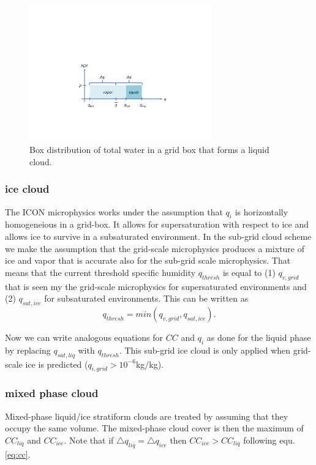 \documentclass[a4paper,11pt]{article}
\begin{document}
\begin{figure}[t]
\centering
\includegraphics*[width=0.7\textwidth,bb=190 130 545 308] {liquidPDF.pdf}
\caption{Box distribution of total water in a grid box that forms a liquid cloud.}
\label{fg:liquidPDF}
\end{figure}

\subsubsection{ice cloud}

The ICON microphysics works under the assumption that $q_i$ is horizontally homogeneious in a grid-box.
It allows for supersaturation with respect to ice and allows ice to survive in a subsaturated environment.
In the sub-grid cloud scheme we make the assumption that the grid-scale microphysics produces a mixture of
ice and vapor that is accurate also for the sub-grid scale microphysics.  That means that the current threshold
specific humidity $q_{thresh}$ is equal to (1) $q_{v,grid}$ that is seen my the grid-scale microphysics for supersaturated
environments and (2) $q_{sat,ice}$ for subsaturated environments.  This can be written as
\begin{equation}
q_{thresh} =  min(q_{v,grid}, q_{sat,ice}).
\end{equation}

Now we can write analogous equations for $CC$ and $q_i$ as done for the liquid phase by replacing $q_{sat,liq}$
with $q_{thresh}$.  This sub-grid ice cloud is only applied when grid-scale ice is predicted 
($q_{i,grid} > 10^{-6}$kg/kg).


\subsubsection{mixed phase cloud}

Mixed-phase liquid/ice stratiform clouds are treated by assuming that they occupy the same volume.  
The mixed-phase cloud cover is then the maximum of $CC_{liq}$ and $CC_{ice}$.  Note that if 
$\triangle q_{liq} = \triangle q_{ice}$ then $CC_{ice} > CC_{liq}$ following equ. \ref{eq:cc}.
 
\end{document}
